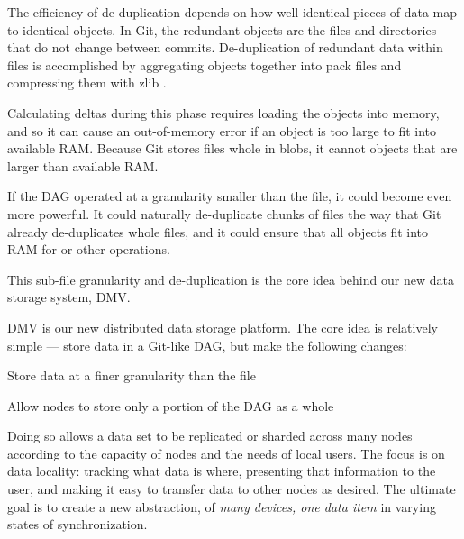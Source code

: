 The efficiency of de-duplication depends on how well identical pieces of data map to identical objects.
In Git, the redundant objects are the files and directories that do not change between commits.
De-duplication of redundant data within files is accomplished by aggregating objects together into pack files and compressing them with zlib \cite[Section 10.4]{git_book}.

Calculating deltas during this  phase requires loading the objects into memory, and so it can cause an out-of-memory error if an object is too large to fit into available RAM.
Because Git stores files whole in \glspl{blob}, it cannot  objects that are larger than available RAM.

If the \gls{DAG} operated at a granularity smaller than the file, it could become even more powerful.
It could naturally de-duplicate chunks of files the way that Git already de-duplicates whole files, and it could ensure that all objects fit into RAM for  or other operations.

This sub-file granularity and de-duplication is the core idea behind our new data storage system, \acrlong{DMV}.

%



\gls{DMV} is our new distributed data storage platform.
The core idea is relatively simple --- store data in a Git-like \gls{DAG}, but make the following changes:

\begin{tight_enumerate}

    \item{Store data at a finer granularity than the file}

    \item{Allow nodes to store only a portion of the \gls{DAG} as a whole}

\end{tight_enumerate}

Doing so allows a data set to be replicated or sharded across many nodes according to the capacity of nodes and the needs of local users.
The focus is on data locality: tracking what data is where, presenting that information to the user, and making it easy to transfer data to other nodes as desired.
The ultimate goal is to create a new abstraction, of \emph{many devices, one data item} in varying states of synchronization.

